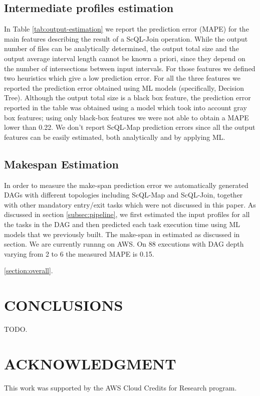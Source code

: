 \documentclass[a4paper, 10pt, conference]{ieeeconf}      %
\begin{document}
\subsection{Intermediate profiles estimation}
In Table \ref{tab:output-estimation} we report the prediction error (MAPE) for the main features describing the result of a ScQL-Join operation.
While the output number of files can be analytically determined, the output total size and the output average interval length cannot be known a priori, since they depend on the number of intersections between input intervals. For those features we defined two heuristics which give a low prediction error. For all the three features we reported the prediction error obtained using ML models (specifically, Decision Tree). Although the output total size is a black box feature, the prediction error reported in the table was obtained using a model which took into account gray box features; using only black-box features we were not able to obtain a  MAPE lower than 0.22. We don't report ScQL-Map prediction errors since all the output features can be easily estimated, both analytically and by applying ML.





\subsection{Makespan Estimation}

In order to measure the make-span prediction error we automatically generated DAGs with different topologies including ScQL-Map and ScQL-Join, together with other mandatory entry/exit tasks which were not discussed in this paper. As discussed in section \ref{subsec:pipeline}, we first estimated the input profiles for all the tasks in the DAG and then predicted each task execution time using ML models that we previously built. The make-span in estimated as discussed in section.
\color{blue}
We are currently runnng on AWS. On 88 executions with DAG depth varying from 2 to 6 the measured MAPE is 0.15.

\ref{section:overall}.





\section{CONCLUSIONS}
TODO.


\section*{ACKNOWLEDGMENT}
This work was supported by the AWS Cloud Credits for Research program.

 
\end{document}
